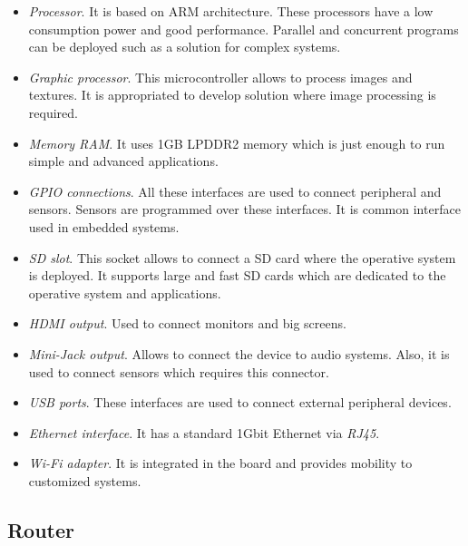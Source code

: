 \begin{itemize}

\item \textit{Processor}. It is based on ARM architecture. These processors have a low consumption power and good performance. Parallel and concurrent programs can be deployed such as a solution for complex systems.

\item \textit{Graphic processor}. This microcontroller allows to process images and textures. It is appropriated to develop solution where image processing is required.

\item \textit{Memory RAM}. It uses 1GB LPDDR2 memory which is just enough to run simple and advanced applications.

\item \textit{GPIO connections}. All these interfaces are used to connect peripheral and sensors. Sensors are programmed over these interfaces. It is common interface used in embedded systems.

\item \textit{SD slot}. This socket allows to connect a SD card where the operative system is deployed. It supports large and fast SD cards which are dedicated to the operative system and applications.

\item \textit{HDMI output}. Used to connect monitors and big screens.

\item \textit{Mini-Jack output}. Allows to connect the device to audio systems. Also, it is used to connect sensors which requires this connector.

\item \textit{USB ports}. These interfaces are used to connect external peripheral devices.

\item \textit{Ethernet interface}. It has a standard 1Gbit Ethernet via \textit{RJ45}.

\item \textit{Wi-Fi adapter}. It is integrated in the board and provides mobility to customized systems.

\end{itemize}

\subsection{Router}

